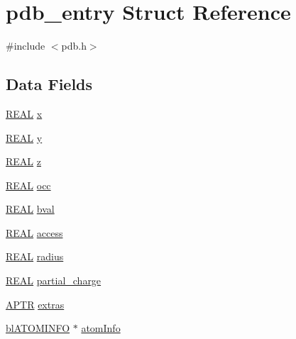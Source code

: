 \hypertarget{structpdb__entry}{\section{pdb\-\_\-entry Struct Reference}
\label{structpdb__entry}
}


{\ttfamily \#include $<$pdb.\-h$>$}

\subsection*{Data Fields}
\begin{DoxyCompactItemize}
\item 
\hyperlink{_math_type_8h_a5821460e95a0800cf9f24c38915cbbde}{R\-E\-A\-L} \hyperlink{structpdb__entry_ad14343030eb6dd7eb6a9c8b4c52fecb0}{x}
\item 
\hyperlink{_math_type_8h_a5821460e95a0800cf9f24c38915cbbde}{R\-E\-A\-L} \hyperlink{structpdb__entry_a1aa467ce26c2e3301d0b78836e30cab0}{y}
\item 
\hyperlink{_math_type_8h_a5821460e95a0800cf9f24c38915cbbde}{R\-E\-A\-L} \hyperlink{structpdb__entry_a9195b0e2ec564479b8a02cc3357410b7}{z}
\item 
\hyperlink{_math_type_8h_a5821460e95a0800cf9f24c38915cbbde}{R\-E\-A\-L} \hyperlink{structpdb__entry_aa16670bec839ae64c16b12fa90810973}{occ}
\item 
\hyperlink{_math_type_8h_a5821460e95a0800cf9f24c38915cbbde}{R\-E\-A\-L} \hyperlink{structpdb__entry_ae02a474aa89a746f306e1fbd46bb8402}{bval}
\item 
\hyperlink{_math_type_8h_a5821460e95a0800cf9f24c38915cbbde}{R\-E\-A\-L} \hyperlink{structpdb__entry_a67301a56812fccd8b3aa6a172dd1e9d8}{access}
\item 
\hyperlink{_math_type_8h_a5821460e95a0800cf9f24c38915cbbde}{R\-E\-A\-L} \hyperlink{structpdb__entry_adbb0a693780e69d9de0f58378fc1eb23}{radius}
\item 
\hyperlink{_math_type_8h_a5821460e95a0800cf9f24c38915cbbde}{R\-E\-A\-L} \hyperlink{structpdb__entry_a0b6d4737223c265ff150250aa2f3cd9c}{partial\-\_\-charge}
\item 
\hyperlink{_sys_defs_8h_a201013872f88d6f535b12e644d7f4d5a}{A\-P\-T\-R} \hyperlink{structpdb__entry_a65eaf0a41f0a5ac660c5fecad6d247b9}{extras}
\item 
\hyperlink{pdb_8h_a28bb9b74c995c4f8940762b601d6fbfc}{bl\-A\-T\-O\-M\-I\-N\-F\-O} $\ast$ \hyperlink{structpdb__entry_ab1a637f5eef3078b04fe57e46ac23590}{atom\-Info}
\item 

\end{DoxyCompactItemize}
